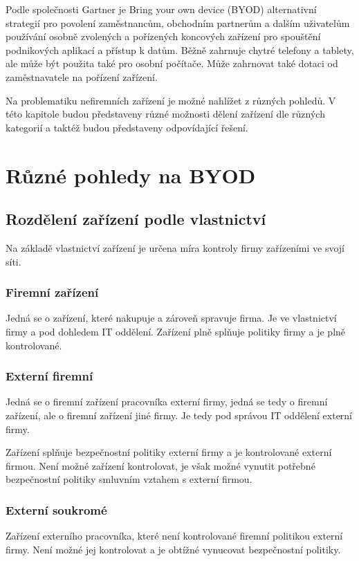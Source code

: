 
Podle společnosti Gartner  je Bring your own device (BYOD) alternativní strategií pro povolení zaměstnancům, obchodním partnerům a dalším uživatelům používání osobně zvolených a pořízených koncových zařízení pro spouštění podnikových aplikací a přístup k datům.  Běžně zahrnuje chytré telefony a tablety, ale může být použita také pro osobní počítače. Může zahrnovat také dotaci od zaměstnavatele na pořízení zařízení.


Na problematiku nefiremních zařízení je možné nahlížet z různých pohledů. V této kapitole budou představeny různé možnosti dělení zařízení dle různých kategorií a taktéž budou představeny odpovídající řešení.


 \section{Různé pohledy na BYOD}
 \subsection{Rozdělení zařízení podle vlastnictví}
 Na základě vlastnictví zařízení je určena míra kontroly firmy zařízeními ve svojí síti.
 
 \subsubsection{Firemní zařízení}
 Jedná se o zařízení, které nakupuje a zároveň spravuje firma. Je ve vlastnictví firmy a pod dohledem IT oddělení. Zařízení plně splňuje politiky firmy a je plně kontrolované.
 
 \subsubsection{Externí firemní}
 Jedná se o firemní zařízení pracovníka externí firmy, jedná se tedy o firemní zařízení, ale o firemní zařízení jiné firmy. Je tedy pod správou IT oddělení externí firmy.
 
 Zařízení splňuje bezpečnostní politiky externí firmy a je kontrolované externí firmou. Není možné zařízení kontrolovat, je však možné vynutit potřebné bezpečnostní politiky smluvním vztahem s externí firmou.
 
 \subsubsection{Externí soukromé}
 Zařízení externího pracovníka, které není kontrolované firemní politikou externí firmy. Není možné jej kontrolovat a je obtížné vynucovat bezpečnostní politiky.
 
